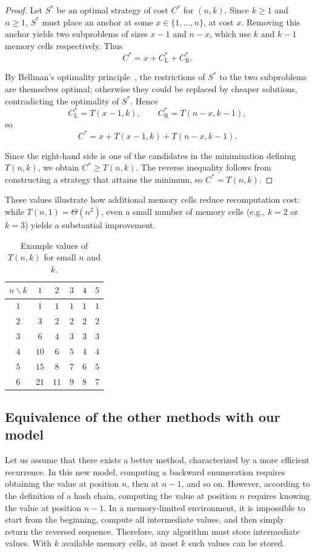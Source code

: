 \documentclass[a4paper,10pt]{article}
\begin{document}
\begin{proof}
Let $S^*$ be an optimal strategy of cost $C^*$ for $(n,k)$. Since $k \ge 1$ and $n \ge 1$, $S^*$ must place an anchor at some $x \in \{1,\dots,n\}$, at cost $x$. Removing this anchor yields two subproblems of sizes $x-1$ and $n-x$, which use $k$ and $k-1$ memory cells respectively. Thus
\[
C^* = x + C^*_{\mathrm{L}} + C^*_{\mathrm{R}}.
\]

By Bellman’s optimality principle~\cite{bellman1957dynamic, bertsekas1995dynamic}, the restrictions of $S^*$ to the two subproblems are themselves optimal; otherwise they could be replaced by cheaper solutions, contradicting the optimality of $S^*$. Hence
\[
C^*_{\mathrm{L}} = T(x-1,k),\qquad C^*_{\mathrm{R}} = T(n-x,k-1),
\]
so
\[
C^* = x + T(x-1,k) + T(n-x,k-1).
\]

Since the right-hand side is one of the candidates in the minimization defining $T(n,k)$, we obtain $C^* \ge T(n,k)$. The reverse inequality follows from constructing a strategy that attains the minimum, so $C^*=T(n,k)$.
\end{proof}
These values illustrate how additional memory cells reduce recomputation cost: while $T(n,1)=\Theta(n^2)$, even a small number of memory cells (e.g., $k=2$ or $k=3$) yields a substantial improvement.
\begin{table}[H]
\centering
\caption{Example values of $T(n,k)$ for small $n$ and $k$.}
\label{tab:small-values}
\medskip
\begin{tabular}{c|ccccc}
\toprule
$n \backslash k$ & $1$ & $2$ & $3$ & $4$ & $5$ \\
\midrule
$1$ & $1$ & $1$ & $1$ & $1$ & $1$ \\
$2$ & $3$ & $2$ & $2$ & $2$ & $2$ \\
$3$ & $6$ & $4$ & $3$ & $3$ & $3$ \\
$4$ & $10$ & $6$ & $5$ & $4$ & $4$ \\
$5$ & $15$ & $8$ & $7$ & $6$ & $5$ \\
$6$ & $21$ & $11$ & $9$ & $8$ & $7$ \\
\bottomrule
\end{tabular}
\end{table}

\subsection{Equivalence of the other methods with our model}
Let us assume that there exists a better method, characterized by a more efficient recurrence.  
In this new model, computing a backward enumeration requires obtaining the value at position $n$, then at $n-1$, and so on.  
However, according to the definition of a hash chain, computing the value at position $n$ requires knowing the value at position $n-1$.  
In a memory-limited environment, it is impossible to start from the beginning, compute all intermediate values, and then simply return the reversed sequence.  
Therefore, any algorithm must store intermediate values. With $k$ available memory cells, at most $k$ such values can be stored.  
\end{document}
